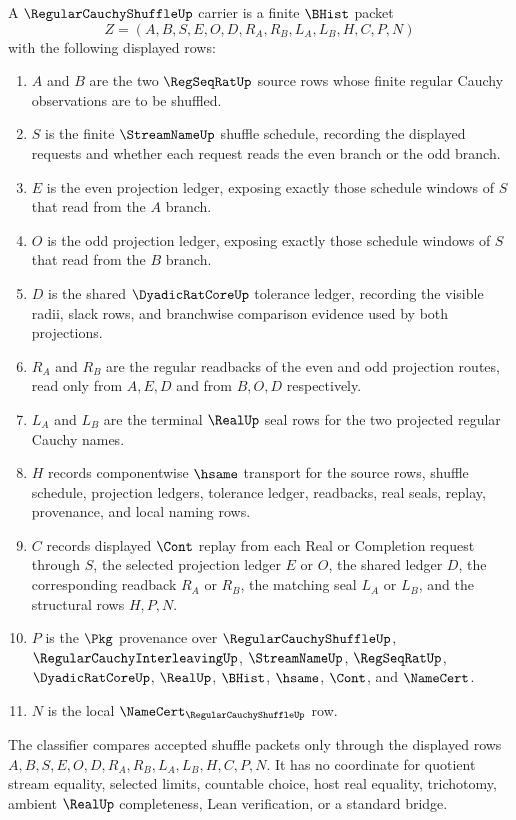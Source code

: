 \begin{definition}
\label{def:regular-cauchy-shuffle-carrier}
A $\RegularCauchyShuffleUp$ carrier is a finite $\BHist$ packet
$$
Z=(A,B,S,E,O,D,R_A,R_B,L_A,L_B,H,C,P,N)
$$
with the following displayed rows:
\begin{enumerate}
\item $A$ and $B$ are the two $\RegSeqRatUp$ source rows whose finite regular Cauchy observations are to be shuffled.
\item $S$ is the finite $\StreamNameUp$ shuffle schedule, recording the displayed requests and whether each request reads the even branch or the odd branch.
\item $E$ is the even projection ledger, exposing exactly those schedule windows of $S$ that read from the $A$ branch.
\item $O$ is the odd projection ledger, exposing exactly those schedule windows of $S$ that read from the $B$ branch.
\item $D$ is the shared $\DyadicRatCoreUp$ tolerance ledger, recording the visible radii, slack rows, and branchwise comparison evidence used by both projections.
\item $R_A$ and $R_B$ are the regular readbacks of the even and odd projection routes, read only from $A,E,D$ and from $B,O,D$ respectively.
\item $L_A$ and $L_B$ are the terminal $\RealUp$ seal rows for the two projected regular Cauchy names.
\item $H$ records componentwise $\hsame$ transport for the source rows, shuffle schedule, projection ledgers, tolerance ledger, readbacks, real seals, replay, provenance, and local naming rows.
\item $C$ records displayed $\Cont$ replay from each Real or Completion request through $S$, the selected projection ledger $E$ or $O$, the shared ledger $D$, the corresponding readback $R_A$ or $R_B$, the matching seal $L_A$ or $L_B$, and the structural rows $H,P,N$.
\item $P$ is the $\Pkg$ provenance over $\RegularCauchyShuffleUp$, $\RegularCauchyInterleavingUp$, $\StreamNameUp$, $\RegSeqRatUp$, $\DyadicRatCoreUp$, $\RealUp$, $\BHist$, $\hsame$, $\Cont$, and $\NameCert$.
\item $N$ is the local $\NameCert_{\RegularCauchyShuffleUp}$ row.
\end{enumerate}
The classifier compares accepted shuffle packets only through the displayed rows $A,B,S,E,O,D,R_A,R_B,L_A,L_B,H,C,P,N$. It has no coordinate for quotient stream equality, selected limits, countable choice, host real equality, trichotomy, ambient $\RealUp$ completeness, Lean verification, or a standard bridge.
\end{definition}

